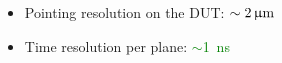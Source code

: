 \begin{frame}
\begin{columns}
    \begin{itemize}
    \item Pointing resolution on the DUT:
      \textcolor{Green}{$\sim2\,\upmu\mathrm{m}$}
    \item Time resolution per plane: \textcolor{Green}{$\sim$1~ns}
    \end{itemize}


        

  \end{columns}

\end{frame}


